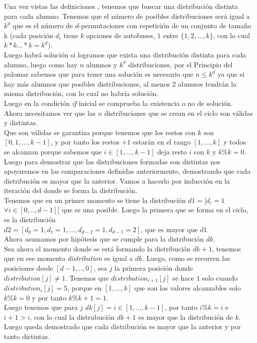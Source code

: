 \documentclass[12pt]{article}
\begin{document}
Una vez vistas las definiciones , tenemos que buscar una distribuci\'on distinta para cada alumno. 
Tenemos que el n\'umero de posibles distribuciones ser\'a igual a $k^d$ que es el n\'umero de $d$-permutaciones con repetici\'on de un conjunto de tama\~no k (cada posici\'on $d_i$ tiene $k$ opciones de autobuses, $1$ 
entre $\{1,2,...,k\}$, con lo cual $k*k...*k = k^d$).\\
Luego habr\'a soluci\'on si logramos que exista una distribuci\'on distinta para cada alumno, luego como hay $n$ alumnos y $k^d$ distribuciones, por el Principio del palomar sabemos que para tener una soluci\'on 
es necesario que $n\leq k^d$ ya que si hay m\'as alumnos que posibles distribuciones, al menos 2 alumnos tendr\'an la misma distribuci\'on, con lo cual no habr\'ia soluci\'on.\\ 
Luego  en la condici\'on \textit{if} inicial se comprueba la existencia o no de soluci\'on.\\
Ahora necesitamos ver que las $n$ distribuciones que se crean en el ciclo son v\'alidas y distintas.\\
Que son v\'alidas se garantiza porque tenemos que los restos con $k$ son $[0,1,...,k-1]$, y por tanto los restos $+1$ estar\'an en el rango $[1,...,k]$ y todos se alcanzan porque sabemos que $i\in[1,...,k-1]$ deja 
resto $i$ con $k$ y $k\%k=0$.\\
Luego para demostrar que las distribuciones formadas son distintas nos apoyaremos en las comparaciones definidas anteriormente, demostrando que cada distribuci\'on es mayor que la anterior. Vamos a hacerlo por inducci\'on en la iteraci\'on del donde se forma la distribuci\'on.\\
 Tenemos que en un primer momento se tiene la distribuci\'on $d1 = [d_i=1$ $\forall i\in [0,..,d-1]]$ que es una posible. Luego la primera que se forma en el ciclo, es la distribuci\'on \\
 $ d2 = [d_0=1,d_1=1,...,d_{d-2}=1,d_{d-1} = 2]$, que es mayor que $d1$.\\ 
 Ahora asumamos por hip\'otesis que se cumple para la distribuci\'on $dk$.\\ 
 Sea ahora el momento donde se est\'a formando la distribuci\'on $dk+1$, tenemos que en ese momento \textit{distribution} es igual a $dk$. Luego, como se recorren las posiciones desde $[d-1,..,0]$, sea $j$ la primera posici\'on donde \textit{$distribution[j]\neq 1$}. Tenemos que $distribution_{i+1} [j]$ se hace $1$ solo cuando $distribution_{i} [j] = 5$, porque en $[1,...,k]$ que son los valores alcanzables solo $k\%k=0$ y por tanto 
 $k\%k+1=1$.\\
 Luego tenemos que para $j$ $dk[j]= i \in[1,...,k-1]$, por tanto $i\%k=i$ e $i + 1 > i$, con lo cual la 
 distrubuci\'on $dk+1$ es mayor que la distribuci\'on de $k$. Luego queda demostrado que cada distribuci\'on es mayor que la anterior y por tanto distintas.\\
 
\end{document}
